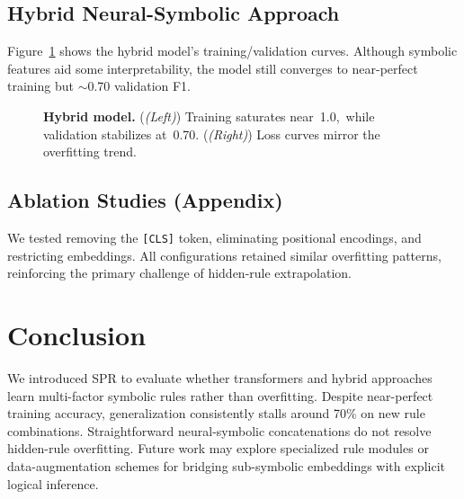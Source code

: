 \documentclass{article} %
\renewcommand{\figleft}{{\em (Left)\/}}
\renewcommand{\figright}{{\em (Right)\/}}
\begin{document}
\subsection{Hybrid Neural-Symbolic Approach}
Figure~\ref{fig:research_curves} shows the hybrid model's training/validation curves. Although symbolic features aid some interpretability, the model still converges to near-perfect training but $\sim$0.70 validation F1.

\begin{figure}[t]
\centering
{}
\caption{\textbf{Hybrid model.} (\figleft) Training saturates near~1.0,\ while validation stabilizes at~0.70. (\figright) Loss curves mirror the overfitting trend.}
\label{fig:research_curves}
\end{figure}

\subsection{Ablation Studies (Appendix)}
We tested removing the \texttt{[CLS]} token, eliminating positional encodings, and restricting embeddings. All configurations retained similar overfitting patterns, reinforcing the primary challenge of hidden-rule extrapolation.

\section{Conclusion}
We introduced SPR to evaluate whether transformers and hybrid approaches learn multi-factor symbolic rules rather than overfitting. Despite near-perfect training accuracy, generalization consistently stalls around 70\% on new rule combinations. Straightforward neural-symbolic concatenations do not resolve hidden-rule overfitting. Future work may explore specialized rule modules or data-augmentation schemes for bridging sub-symbolic embeddings with explicit logical inference.
\end{document}
